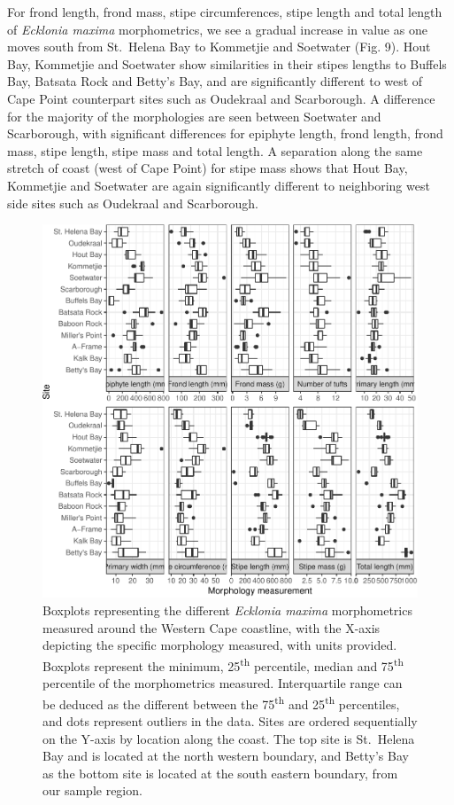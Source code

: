 \documentclass[10pt,a4,]{article}
\makeatletter
\def\maxwidth{\ifdim\Gin@nat@width>\linewidth\linewidth
\else\Gin@nat@width\fi}
\let\Oldincludegraphics\includegraphics
\renewcommand{\includegraphics}[1]{\Oldincludegraphics[width=\maxwidth]{#1}}
\makeatother
\begin{document}
For frond length, frond mass, stipe circumferences, stipe length and
total length of \emph{Ecklonia maxima} morphometrics, we see a gradual
increase in value as one moves south from St.~Helena Bay to Kommetjie
and Soetwater (Fig. 9). Hout Bay, Kommetjie and Soetwater show
similarities in their stipes lengths to Buffels Bay, Batsata Rock and
Betty's Bay, and are significantly different to west of Cape Point
counterpart sites such as Oudekraal and Scarborough. A difference for
the majority of the morphologies are seen between Soetwater and
Scarborough, with significant differences for epiphyte length, frond
length, frond mass, stipe length, stipe mass and total length. A
separation along the same stretch of coast (west of Cape Point) for
stipe mass shows that Hout Bay, Kommetjie and Soetwater are again
significantly different to neighboring west side sites such as Oudekraal
and Scarborough.

\begin{figure}
\centering
\includegraphics{chapter_2_files/figure-latex/unnamed-chunk-18-1.pdf}
\caption{Boxplots representing the different \emph{Ecklonia maxima}
morphometrics measured around the Western Cape coastline, with the
X-axis depicting the specific morphology measured, with units provided.
Boxplots represent the minimum, 25\textsuperscript{th} percentile,
median and 75\textsuperscript{th} percentile of the morphometrics
measured. Interquartile range can be deduced as the different between
the 75\textsuperscript{th} and 25\textsuperscript{th} percentiles, and
dots represent outliers in the data. Sites are ordered sequentially on
the Y-axis by location along the coast. The top site is St.~Helena Bay
and is located at the north western boundary, and Betty's Bay as the
bottom site is located at the south eastern boundary, from our sample
region.}
\end{figure}
\end{document}
